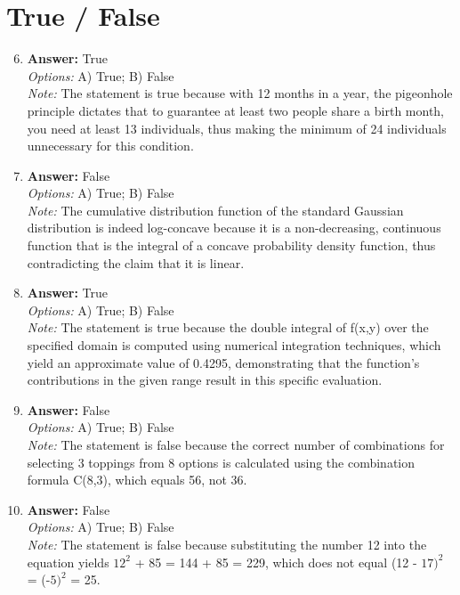 \documentclass[12pt]{article}
\begin{document}
\section*{True / False}
\begin{enumerate}[label=\arabic*.]
\setcounter{enumi}{5}
\item \textbf{Answer:} True
\\ \textit{Options:} A) True; B) False
\\ \textit{Note:} The statement is true because with 12 months in a year, the pigeonhole principle dictates that to guarantee at least two people share a birth month, you need at least 13 individuals, thus making the minimum of 24 individuals unnecessary for this condition.
\item \textbf{Answer:} False
\\ \textit{Options:} A) True; B) False
\\ \textit{Note:} The cumulative distribution function of the standard Gaussian distribution is indeed log-concave because it is a non-decreasing, continuous function that is the integral of a concave probability density function, thus contradicting the claim that it is linear.
\item \textbf{Answer:} True
\\ \textit{Options:} A) True; B) False
\\ \textit{Note:} The statement is true because the double integral of f(x,y) over the specified domain is computed using numerical integration techniques, which yield an approximate value of 0.4295, demonstrating that the function's contributions in the given range result in this specific evaluation.
\item \textbf{Answer:} False
\\ \textit{Options:} A) True; B) False
\\ \textit{Note:} The statement is false because the correct number of combinations for selecting 3 toppings from 8 options is calculated using the combination formula C(8,3), which equals 56, not 36.
\item \textbf{Answer:} False
\\ \textit{Options:} A) True; B) False
\\ \textit{Note:} The statement is false because substituting the number 12 into the equation yields $12^2$ + 85 = 144 + 85 = 229, which does not equal (12 - $17)^2$ = (-$5)^2$ = 25.
\end{enumerate}
\end{document}
